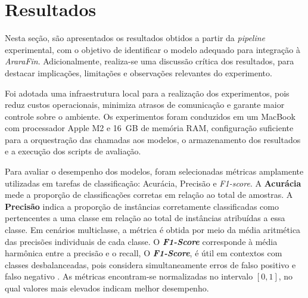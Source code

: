 \documentclass[12pt]{article}
\begin{document}



\section{Resultados}

Nesta seção, são apresentados os resultados obtidos a partir da \textit{pipeline} experimental, com o objetivo de identificar o modelo adequado para integração à \textit{AraraFin}. Adicionalmente, realiza-se uma discussão crítica dos resultados, para destacar implicações, limitações e observações relevantes do experimento.

Foi adotada uma infraestrutura local para a realização dos experimentos, pois reduz custos operacionais, minimiza atrasos de comunicação e garante maior controle sobre o ambiente. Os experimentos foram conduzidos em um MacBook com processador Apple M2 e 16~GB de memória RAM, configuração suficiente para a orquestração das chamadas aos modelos, o armazenamento dos resultados e a execução dos scripts de avaliação.


Para avaliar o desempenho dos modelos, foram selecionadas métricas amplamente utilizadas em tarefas de classificação: Acurácia, Precisão e \textit{F1-score}.
A \textbf{Acurácia} mede a proporção de classificações corretas em relação ao total de amostras. A \textbf{Precisão} indica a proporção de instâncias corretamente classificadas como pertencentes a uma classe em relação ao total de instâncias atribuídas a essa classe.  Em cenários multiclasse, a métrica é obtida por meio da média aritmética das precisões individuais de cada classe. O \textbf{\textit{F1-Score}} corresponde à média harmônica entre a precisão e o recall, O \textbf{\textit{F1-Score}}, é útil em contextos com classes desbalanceadas, pois considera simultaneamente erros de falso positivo e falso negativo \cite{caseli2024processamento}. As métricas encontram-se normalizadas no intervalo $[0,1]$, no qual valores mais elevados indicam melhor desempenho.
\end{document}
